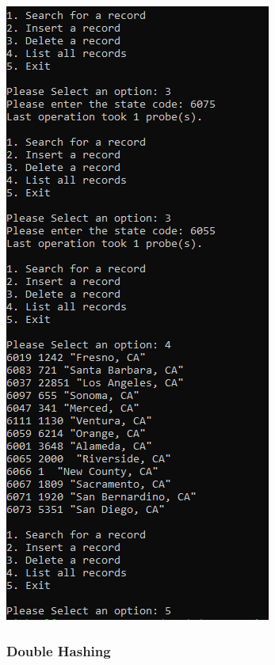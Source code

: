 \documentclass[titlepage]{article}
\begin{document}
\includegraphics[]{Small_Input/LF_0_25/LinearProbe_3.png}\newpage 
\subsubsection{Double Hashing}
\end{document}
